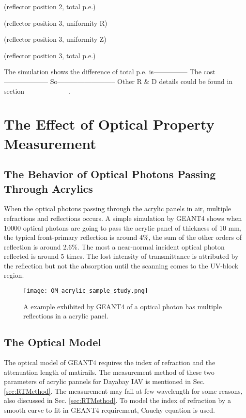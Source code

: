 (reflector position 2, total p.e.)




(reflector position 3, uniformity R)




(reflector position 3, uniformity Z)




(reflector position 3, total p.e.)


The simulation shows the difference of total p.e. is---------------
The cost--------------------
So--------------------------
Other R \& D details could be found in section--------------------.


\section {The Effect of Optical Property Measurement}
\subsection {The Behavior of Optical Photons Passing Through Acrylics}

When the optical photons passing through the acrylic panels in air, multiple refractions
and reflections occurs. A simple simulation by GEANT4 shows when 10000 optical photons
are going to pass the acrylic panel of thickness of 10 mm, the typical front-primary
reflection is around 4\%, the sum of the other orders of reflection is around 2.6\%.
The most a near-normal incident optical photon reflected is around 5 times.
The lost intensity of transmittance is attributed by the reflection but not the
absorption until the scanning comes to the UV-block region.


\begin{figure}
    \centering
    \texttt{[image: OM\_acrylic\_sample\_study.png]}
    \caption[A example exhibited by GEANT4 of a optical photon has multiple reflections in a acrylic panel.]
{
A example exhibited by GEANT4 of a optical photon has multiple reflections in a acrylic panel.
}
    \label{fig:OM_acrylic_sample_study.png}
    \end{figure}


\subsection {The Optical Model}
\label{sec:opticalModel}

The optical model of GEANT4 requires the index of refraction and the attenuation length
of matirails. The measurement method of these two parameters of acrylic pannels for Dayabay IAV
is mentioned in Sec. \ref{sec:RTMethod}.
The measurement may fail at few wavelength for some reasons, also discussed
in Sec. \ref{sec:RTMethod}.
To model the index of refraction by a smooth curve to fit in GEANT4 requirement, Cauchy equation
is used.

